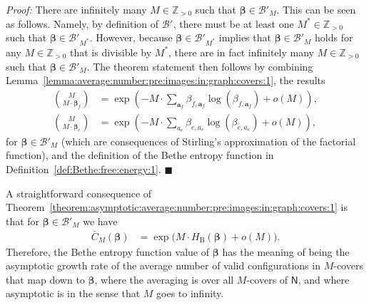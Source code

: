 \documentclass[journal, twocolumn]{IEEEtran}
\renewcommand{\mathbf}[1]{{\bm{#1}}}
\newcommand{\Z}{\mathbb{Z}}
\newcommand{\Zpp}{\Z_{>0}}
\newcommand{\vect}[1]{\mathbf{#1}}
\newcommand{\graph}[1]{\mathsf{#1}}
\newcommand{\bel}{\beta}
\newcommand{\vbel}{\boldsymbol{\bel}}
\newcommand{\va}{\vect{a}}
\newcommand{\lmpBdown}[1]{\mathcal{B}'_{#1}}
\newcommand{\HBethe}{H_{\mathrm{B}}}
\newcommand{\?}{\mathrm{?}}
\newcommand{\qedblack}{\hspace*{\fill}%
  $\blacksquare$\smallskip}
\newenvironment{Proof}%
  {\noindent \emph{Proof:}}{\qedblack}
\begin{document}
\begin{Proof}
  There are infinitely many $M \in \Zpp$ such that $\vbel \in
  \lmpBdown{M}$. This can be seen as follows. Namely, by definition of
  $\lmpBdown{}$, there must be at least one $M^* \in \Zpp$ such that $\vbel \in
  \lmpBdown{M^*}$. However, because $\vbel \in \lmpBdown{M^*}$ implies that
  $\vbel \in \lmpBdown{M}$ holds for any $M \in \Zpp$ that is divisible by
  $M^*$, there are in fact infinitely many $M \in \Zpp$ such that $\vbel \in
  \lmpBdown{M}$. The theorem statement then follows by combining
  Lemma~\ref{lemma:average:number:pre:images:in:graph:covers:1}, the results
  \begin{align*}
    {M \choose M \cdot \vbel_f}
      &= \exp
           \left(
             -
             M
             \cdot
             \sum_{\va_f}
               \bel_{f,\va_f}
               \log
               \left(
                 \bel_{f,\va_f}
               \right)
             +
             o(M)
           \right), \\
    {M \choose M \cdot \vbel_e}
      &= \exp
           \left(
             -
             M
             \cdot
             \sum_{a_e}
               \bel_{e,a_e}
               \log
               \left(
                 \bel_{e,a_e}
               \right)
             +
             o(M)
           \right),
  \end{align*}
  for $\vbel \in \lmpBdown{M}$ (which are consequences of Stirling's approximation
  of the factorial function), and the definition of the Bethe entropy function
  in Definition~\ref{def:Bethe:free:energy:1}.
\end{Proof}




A straightforward consequence of
Theorem~\ref{theorem:asymptotic:average:number:pre:images:in:graph:covers:1}
is that for $\vbel \in \lmpBdown{M}$ we have
\begin{align}
  \bar C_M(\vbel)
    &= \exp\big( M \cdot \HBethe(\vbel) + o(M) \big).
         \label{eq:asymptotic:average:number:pre:images:in:graph:covers:1}
\end{align}
Therefore, the Bethe entropy function value of $\vbel$ has the meaning of
being the asymptotic growth rate of the average number of valid configurations
in $M$-covers that map down to $\vbel$, where the averaging is over all
$M$-covers of $\graph{N}$, and where asymptotic is in the sense that $M$ goes
to infinity.
\end{document}
